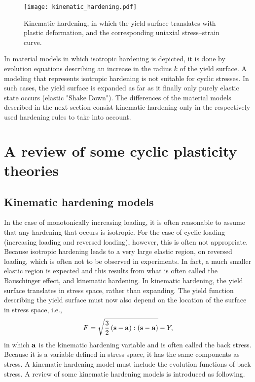 \begin{figure}[htbp]
	\centering
	\texttt{[image: kinematic\_hardening.pdf]}
	\caption{Kinematic hardening, in which the yield surface translates with plastic deformation, and the corresponding uniaxial stress–strain curve.}
	\label{Fig:kinematic_hardening}
\end{figure}

In material models in which isotropic hardening is depicted, it is done by evolution equations describing an increase in the radius $k$ of the yield surface.
A modeling that represents isotropic hardening is not suitable for cyclic stresses.
In such cases, the yield surface is expanded as far as it finally only purely elastic state occurs (elastic "Shake Down").
The differences of the material models described in the next section consist kinematic hardening only in the respectively used hardening rules to take into account.

\section{A review of some cyclic plasticity theories}
\subsection{Kinematic hardening models}
\noindent
In the case of monotonically increasing loading, it is often reasonable to assume that any hardening that occurs is isotropic.
For the case of cyclic loading (increasing loading and reversed loading), however, this is often not appropriate.
Because isotropic hardening leads to a very large elastic region, on reversed loading, which is often not to be observed in experiments.
In fact, a much smaller elastic region is expected and this results from what is often called the Bauschinger effect, and
kinematic hardening.
In kinematic hardening, the yield surface translates in stress space, rather than expanding.
The yield function describing the yield surface must now also depend on the location of the surface in stress space, i.e.,
\begin{equation}
F = \sqrt {\frac{3}{2}\left( {{\bf{s}} - {\bf{a}}} \right):\left( {{\bf{s}} - {\bf{a}}} \right)}  - Y,
\end{equation}
in which $\bf{a}$ is the kinematic hardening variable and is often called the back stress.
Because it is a variable defined in stress space, it has the same components as stress.
A kinematic hardening model must include the evolution functions of back stress.
A review of some kinematic hardening models is introduced as following.

